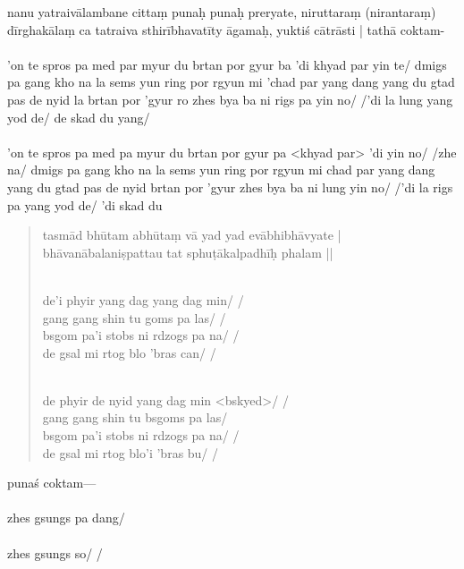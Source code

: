 \documentclass[12pt]{article}
\begin{document}
nanu yatraivālambane cittaṃ punaḥ punaḥ preryate, niruttaraṃ (nirantaraṃ) dīrghakālaṃ ca tatraiva sthirībhavatīty āgamaḥ, yuktiś cātrāsti | tathā coktam-\\

\textbf{\TVA}\\
'on te spros pa med par myur du brtan por gyur ba 'di khyad par yin te/ dmigs pa gang kho na la sems yun ring por rgyun mi 'chad par yang dang yang du gtad pas de nyid la brtan por 'gyur ro zhes bya ba ni rigs pa yin no/ /'di la lung yang yod de/ de skad du yang/\\

\textbf{\TVB}\\
'on te spros pa med pa myur du brtan por gyur pa <khyad par> 'di yin no/ /zhe na/ dmigs pa gang kho na la sems yun ring por rgyun mi chad par yang dang yang du gtad pas de nyid brtan por 'gyur zhes bya ba ni lung yin no/ /'di la rigs pa yang yod de/ 'di skad du 

\begin{quote}
	tasmād bhūtam abhūtaṃ vā yad yad evābhibhāvyate | \\
	bhāvanābalaniṣpattau tat sphuṭākalpadhīḥ phalam ||

	\textbf{\TVA}\\
	de'i phyir yang dag yang dag min/ /\\
	gang gang shin tu goms pa las/ /\\
	bsgom pa'i stobs ni rdzogs pa na/ /\\
	de gsal mi rtog blo 'bras can/ /

	\textbf{\TVB}\\
	de phyir de nyid yang dag min <bskyed>/ /\\
	gang gang shin tu bsgoms pa las/ \\
	bsgom pa'i stobs ni rdzogs pa na/ /\\
	de gsal mi rtog blo'i 'bras bu/ /
\end{quote}

punaś coktam—\\

\textbf{\TVA}\\
zhes gsungs pa dang/\\

\textbf{\TVB}\\
zhes gsungs so/ /\\
\end{document}
